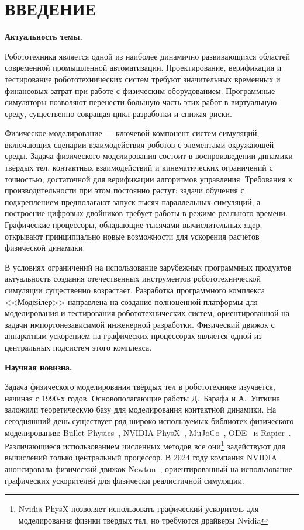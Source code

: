 \chapter*{ВВЕДЕНИЕ}

\textbf{Актуальность темы.}

Робототехника является одной из наиболее динамично развивающихся областей современной промышленной 
автоматизации. Проектирование, верификация и тестирование робототехнических систем требуют значительных 
временных и финансовых затрат при работе с физическим оборудованием. Программные симуляторы позволяют 
перенести большую часть этих работ в виртуальную среду, существенно сокращая цикл разработки и снижая риски.

Физическое моделирование --- ключевой компонент систем симуляций, включающих сценарии взаимодействия роботов с 
элементами окружающей среды. Задача физического моделирования состоит в воспроизведении динамики твёрдых тел, 
контактных взаимодействий и кинематических ограничений с точностью, достаточной для верификации алгоритмов 
управления. Требования к производительности при этом постоянно растут: задачи обучения с подкреплением 
предполагают запуск тысяч параллельных симуляций, а построение цифровых двойников требует работы в режиме 
реального времени. Графические процессоры, обладающие тысячами вычислительных ядер, открывают 
принципиально новые возможности для ускорения расчётов физической динамики.

В условиях ограничений на использование зарубежных программных продуктов актуальность создания отечественных 
инструментов робототехнической симуляции существенно возрастает. Разработка программного комплекса 
<<Модейлер>> направлена на создание полноценной платформы для моделирования и тестирования робототехнических 
систем, ориентированной на задачи импортонезависимой инженерной разработки. Физический движок с аппаратным 
ускорением на графических процессорах является одной из центральных подсистем этого комплекса.

\textbf{Научная новизна.}

Задача физического моделирования твёрдых тел в робототехнике изучается, начиная с 1990-х годов. 
Основополагающие работы Д.~Барафа и А.~Уиткина~\cite{baraff1997physically} заложили теоретическую базу для 
моделирования контактной динамики. На сегодняшний день существует ряд широко используемых библиотек 
физического моделирования: Bullet Physics~\cite{coumans2015bullet}, NVIDIA PhysX~\cite{physx2023}, 
MuJoCo~\cite{todorov2012mujoco}, ODE~\cite{smith2005ode} и Rapier~\cite{crozet2021rapier}. Различающиеся 
использованием численных методов все они\footnote{Nvidia PhysX позволяет использовать графический ускоритель 
для моделирования физики твёрдых тел, но требуются драйверы Nvidia} задействуют для вычислений только 
центральный процессор. В 2024 году компания NVIDIA анонсировала физический движок 
Newton~\cite{nvidia2024newton}, ориентированный на использование графических ускорителей для физически 
реалистичной симуляции.

